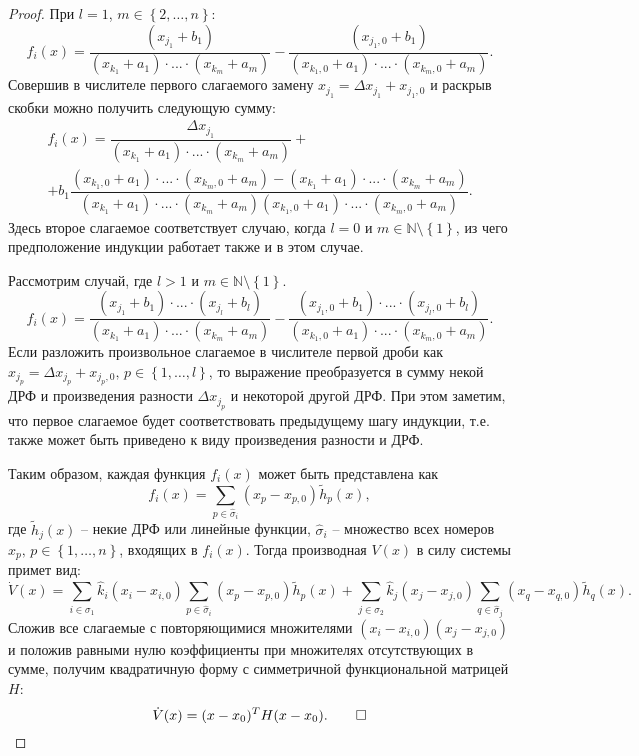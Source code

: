 \documentclass[14pt,a4paper]{extarticle}
\begin{document}
\begin{proof}
		При $l=1$, $m\in\left\{2,\dots,n\right\}$:
		\[f_i(x)=\dfrac{(x_{j_1}+b_1)}{(x_{k_1}+a_1)\cdot...\cdot(x_{k_m}+a_m)}-\dfrac{(x_{j_1,0}+b_1)}{(x_{k_1,0}+a_1)\cdot...\cdot(x_{k_m,0}+a_m)}.\]
		Совершив в числителе первого слагаемого замену $x_{j_1}=\Delta x_{j_1} + x_{j_1,0}$ и раскрыв скобки можно получить следующую сумму:
		\begin{multline*}
			f_i(x)=\dfrac{\Delta x_{j_1}}{(x_{k_1}+a_1)\cdot...\cdot(x_{k_m}+a_m)}+\\
			+b_1\dfrac{(x_{k_1,0}+a_1)\cdot...\cdot(x_{k_m,0}+a_m)-(x_{k_1}+a_1)\cdot...\cdot(x_{k_m}+a_m)}{(x_{k_1}+a_1)\cdot...\cdot(x_{k_m}+a_m)(x_{k_1,0}+a_1)\cdot...\cdot(x_{k_m,0}+a_m)}.
		\end{multline*}
		Здесь второе слагаемое соответствует случаю, когда $l=0$ и $m\in\mathbb{N}\setminus\left\{1\right\}$, из чего предположение индукции работает также и в этом случае. 
		
		Рассмотрим случай, где $l > 1$ и $m\in\mathbb{N}\setminus\left\{1\right\}$.
		\[f_i(x)=\dfrac{(x_{j_1}+b_1)\cdot...\cdot(x_{j_l}+b_l)}{(x_{k_1}+a_1)\cdot...\cdot(x_{k_m}+a_m)}-\dfrac{(x_{j_1,0}+b_1)\cdot...\cdot(x_{j_l,0}+b_l)}{(x_{k_1,0}+a_1)\cdot...\cdot(x_{k_m,0}+a_m)}.\]
		Если разложить произвольное слагаемое в числителе первой дроби как $x_{j_p}=\Delta x_{j_p} + x_{j_p,0},\, p\in\left\{1,\dots,l\right\}$, то выражение преобразуется в сумму некой ДРФ и произведения разности $\Delta x_{j_p}$ и некоторой другой ДРФ. При этом заметим, что первое слагаемое будет соответствовать предыдущему шагу индукции, т.е. также может быть приведено к виду произведения разности и ДРФ.
		
		Таким образом, каждая функция $f_i(x)$ может быть представлена как
		\[f_i(x)=\sum\limits_{p\in\hat{\sigma}_i}(x_p-x_{p,0})\tilde{h}_p(x),\]    
		где $\tilde{h}_j(x)$ -- некие ДРФ или линейные функции, $\hat{\sigma}_i$ -- множество всех номеров $x_p,\, p\in\left\{1,\dots,n\right\}$, входящих в $f_i(x)$. Тогда производная $V(x)$ в силу системы примет вид:
		\[\dot{V}(x)=\sum\limits_{i\in\sigma_1}\hat{k}_i(x_i-x_{i,0})\sum\limits_{p\in\hat{\sigma}_i}(x_p-x_{p,0})\tilde{h}_{p}(x)+\sum\limits_{j\in\sigma_2}\hat{k}_j(x_j-x_{j,0})\sum\limits_{q\in\hat{\sigma}_j}(x_q-x_{q,0})\tilde{h}_{q}(x).\]
		Сложив все слагаемые с повторяющимися множителями $(x_i-x_{i,0})(x_j-x_{j,0})$ и положив равными нулю коэффициенты при множителях отсутствующих в сумме, получим квадратичную форму с симметричной функциональной матрицей $H$:
		\[\dot{V}(x)=(x-x_0)^{T}H(x-x_0).\qed\]
	\end{proof}			
	
\end{document}
